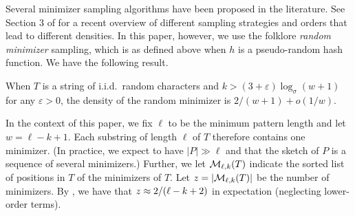 Several minimizer sampling algorithms have been proposed in the literature. See
Section 3 of \cite{grootkoerkamp_et_al:LIPIcs.WABI.2024.11} for a recent
overview of different sampling strategies and orders that lead to different densities.
In this paper, however, we use the folklore \textit{random minimizer} sampling, which is as defined above when $h$ is a pseudo-random hash function.
We have the following result.

\begin{theorem}\label{thm:random-mini}
When $T$ is a string of i.i.d.~random characters and $k > (3+\varepsilon)\log_{\sigma}(w+1)$ for any $\varepsilon > 0$, the density of the random minimizer is $2/(w+1) + o(1/w)$.
\end{theorem}

In the context of this paper, we fix $\ell$ to be the minimum pattern length and let $w=\ell-k+1$. Each substring of length $\ell$ of $T$ therefore contains one minimizer.
(In practice, we expect to have $|P|\gg\ell$ and that the sketch of $P$ is a sequence of several minimizers.)
Further, we let $\mathcal{M}_{\ell,k}(T)$ indicate the sorted list of positions in $T$ of the minimizers of $T$.
Let $z = |\mathcal{M}_{\ell,k}(T)|$ be the number of minimizers.
By , we have that $z \approx 2/(\ell-k+2)$ in expectation (neglecting lower-order terms).


